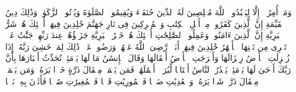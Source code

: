 \stopbuffer%
\startbuffer[\q:98:5]
وَمَاۤ أُمِرُوۤا۟ إِلَّا لِیَعۡبُدُوا۟ ٱللَّهَ مُخۡلِصِینَ لَهُ ٱلدِّینَ حُنَفَاۤءَ وَیُقِیمُوا۟ ٱلصَّلَوٰةَ وَیُؤۡتُوا۟ ٱلزَّكَوٰةَۚ وَذَٰلِكَ دِینُ ٱلۡقَیِّمَةِ%
\stopbuffer%
\startbuffer[\q:98:6]
إِنَّ ٱلَّذِینَ كَفَرُوا۟ مِنۡ أَهۡلِ ٱلۡكِتَٰبِ وَٱلۡمُشۡرِكِینَ فِی نَارِ جَهَنَّمَ خَٰلِدِینَ فِیهَاۤۚ أُو۟لَٰۤئِكَ هُمۡ شَرُّ ٱلۡبَرِیَّةِ%
\stopbuffer%
\startbuffer[\q:98:7]
إِنَّ ٱلَّذِینَ ءَامَنُوا۟ وَعَمِلُوا۟ ٱلصَّٰلِحَٰتِ أُو۟لَٰۤئِكَ هُمۡ خَیۡرُ ٱلۡبَرِیَّةِ%
\stopbuffer%
\startbuffer[\q:98:8]
جَزَاۤؤُهُمۡ عِندَ رَبِّهِمۡ جَنَّٰتُ عَدۡنࣲ تَجۡرِی مِن تَحۡتِهَا ٱلۡأَنۡهَٰرُ خَٰلِدِینَ فِیهَاۤ أَبَدࣰاۖ رَّضِیَ ٱللَّهُ عَنۡهُمۡ وَرَضُوا۟ عَنۡهُۚ ذَٰلِكَ لِمَنۡ خَشِیَ رَبَّهُۥ%
\stopbuffer%
\startbuffer[\q:99:1]
إِذَا زُلۡزِلَتِ ٱلۡأَرۡضُ زِلۡزَالَهَا%
\stopbuffer%
\startbuffer[\q:99:2]
وَأَخۡرَجَتِ ٱلۡأَرۡضُ أَثۡقَالَهَا%
\stopbuffer%
\startbuffer[\q:99:3]
وَقَالَ ٱلۡإِنسَٰنُ مَا لَهَا%
\stopbuffer%
\startbuffer[\q:99:4]
یَوۡمَئِذࣲ تُحَدِّثُ أَخۡبَارَهَا%
\stopbuffer%
\startbuffer[\q:99:5]
بِأَنَّ رَبَّكَ أَوۡحَىٰ لَهَا%
\stopbuffer%
\startbuffer[\q:99:6]
یَوۡمَئِذࣲ یَصۡدُرُ ٱلنَّاسُ أَشۡتَاتࣰا لِّیُرَوۡا۟ أَعۡمَٰلَهُمۡ%
\stopbuffer%
\startbuffer[\q:99:7]
فَمَن یَعۡمَلۡ مِثۡقَالَ ذَرَّةٍ خَیۡرࣰا یَرَهُۥ%
\stopbuffer%
\startbuffer[\q:99:8]
وَمَن یَعۡمَلۡ مِثۡقَالَ ذَرَّةࣲ شَرࣰّا یَرَهُۥ%
\stopbuffer%
\startbuffer[\q:100:1]
وَٱلۡعَٰدِیَٰتِ ضَبۡحࣰا%
\stopbuffer%
\startbuffer[\q:100:2]
فَٱلۡمُورِیَٰتِ قَدۡحࣰا%
\stopbuffer%
\startbuffer[\q:100:3]
فَٱلۡمُغِیرَٰتِ صُبۡحࣰا%
\stopbuffer%
\startbuffer[\q:100:4]
فَأَثَرۡنَ بِهِۦ نَقۡعࣰا%
\stopbuffer%

